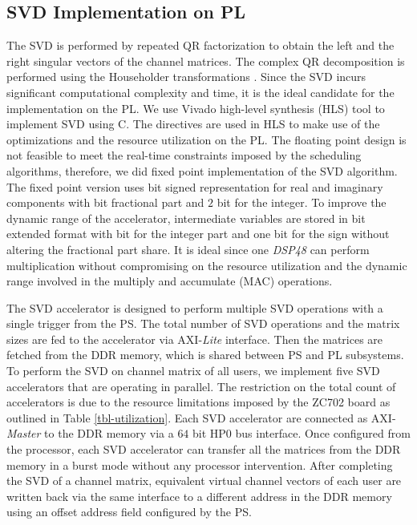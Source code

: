 \documentclass[conference,letterpaper,10pt]{./../../IEEE/IEEEtran}
\begin{document}
\subsection{SVD Implementation on PL}
The SVD is performed by repeated QR factorization to obtain the left and the right singular vectors of the channel matrices. The complex QR decomposition is performed using the Householder transformations \cite{aft}. Since the SVD incurs significant computational complexity and time, it is the ideal candidate for the implementation on the PL. We use Vivado high-level synthesis (HLS) tool to implement SVD using C. The directives are used in HLS to make use of the optimizations and the resource utilization on the PL. The floating point design is not feasible to meet the real-time constraints imposed by the scheduling algorithms, therefore, we did fixed point implementation of the SVD algorithm. The fixed point version uses  bit signed representation for real and imaginary components with  bit fractional part and $2$ bit for the integer. To improve the dynamic range of the accelerator, intermediate variables are stored in  bit extended format with  bit for the integer part and one bit for the sign without altering the fractional part share. It is ideal since one \textit{DSP48} \cite{zynq} can perform  multiplication without compromising on the resource utilization and the dynamic range involved in the multiply and accumulate (MAC) operations. 

The SVD accelerator is designed to perform multiple SVD operations with a single trigger from the PS. The total number of SVD operations and the matrix sizes are fed to the accelerator via AXI-\textit{Lite} interface. Then the matrices are fetched from the DDR memory, which is shared between PS and PL subsystems. To perform the SVD on channel matrix of all users, we implement five SVD accelerators that are operating in parallel. The restriction on the total count of accelerators is due to the resource limitations imposed by the ZC702 board as outlined in Table \ref{tbl-utilization}.
Each SVD accelerator are connected as AXI-\textit{Master} to the DDR memory via a $64$ bit HP$0$ bus interface. Once configured from the processor, each SVD accelerator can transfer all the matrices from the DDR memory in a burst mode without any processor intervention. After completing the SVD of a channel matrix, equivalent virtual channel vectors of each user are written back via the same interface to a different address in the DDR memory using an offset address field configured by the PS.
\end{document}
